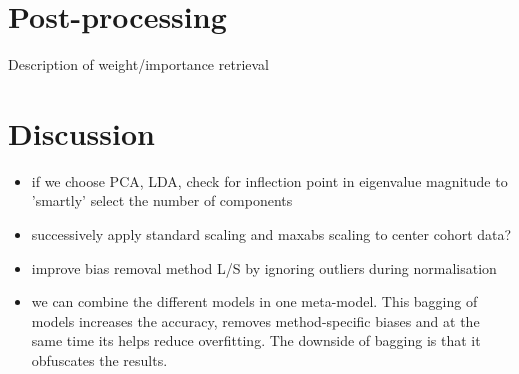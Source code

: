 \documentclass[a4paper,10pt]{article}
\begin{document}
\section{Post-processing}
%
Description of weight/importance retrieval

\section{Discussion}

\begin{itemize}
\item if we choose PCA, LDA, check for inflection point in eigenvalue magnitude to 'smartly' select the number of components
\item successively apply standard scaling and maxabs scaling to center cohort data?
\item improve bias removal method L/S by ignoring outliers during normalisation
\item we can combine the different models in one meta-model. This bagging of models increases the accuracy, removes method-specific biases and at the same time its helps reduce overfitting.
The downside of bagging is that it obfuscates the results.
\end{itemize}



\end{document}

